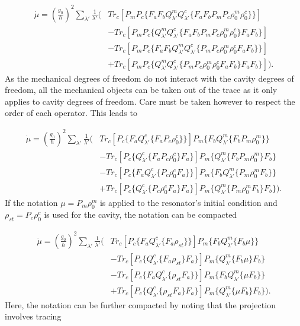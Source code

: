 \documentclass[12pt]{article}
\begin{document}
\begin{align*}
    \dot{\mu} = (\frac{g_0 }{\hbar})^2 \sum_{\lambda'}\frac{1}{\lambda'}\Bigg(& Tr_c[P_mP_c\{F_a F_bQ^m_{\lambda'}Q^c_{\lambda'}\{F_a F_bP_mP_c\rho_0^m\rho_0^c\}\}]\\
    &-Tr_c[P_mP_c\{Q^m_{\lambda'}Q^c_{\lambda'}\{F_a F_bP_mP_c\rho_0^m\rho_0^c\}F_a F_b\}]\\
    &-Tr_c[P_mP_c\{F_a F_bQ^m_{\lambda'}Q^c_{\lambda'}\{P_mP_c\rho_0^m\rho_0^c F_a F_b\} \}]\\ &+Tr_c[P_mP_c\{Q^m_{\lambda'}Q^c_{\lambda'}\{P_mP_c\rho_0^m\rho_0^c F_a F_b\}F_a F_b\}] \Bigg).
\end{align*} As the mechanical degrees of freedom do not interact with the cavity degrees of freedom, all the mechanical objects can be taken out of the trace as it only applies to cavity degrees of freedom. Care must be taken however to respect the order of each operator. This leads to

\begin{align*}
    \dot{\mu} = (\frac{g_0 }{\hbar})^2 \sum_{\lambda'}\frac{1}{\lambda'}\Bigg(& Tr_c[P_c\{F_a Q^c_{\lambda'}\{F_a P_c\rho_0^c\}\}]P_m\{F_bQ^m_{\lambda'}\{F_bP_m\rho_0^m\}\}\\
    &-Tr_c[P_c\{Q^c_{\lambda'}\{F_a P_c\rho_0^c\}F_a \}]P_m\{Q^m_{\lambda'}\{F_bP_m\rho_0^m\}F_b\}\\
    &-Tr_c[P_c\{F_a Q^c_{\lambda'}\{P_c\rho_0^cF_a \} \}]P_m\{F_bQ^m_{\lambda'}\{ P_m\rho_0^mF_b\}\}\\ &+Tr_c[P_c\{Q^c_{\lambda'}\{P_c\rho_0^cF_a  \}F_a \}]P_m\{Q^m_{\lambda'}\{P_m\rho_0^mF_b\}F_b\} \Bigg).
\end{align*} If the notation $\mu=P_m\rho_0^m$ is applied to the resonator's initial condition and $\rho_{st}=P_c\rho_0^c$ is used for the cavity, the notation can be compacted

\begin{align*}
    \dot{\mu} = (\frac{g_0 }{\hbar})^2 \sum_{\lambda'}\frac{1}{\lambda'}\Bigg(& Tr_c[P_c\{F_a Q^c_{\lambda'}\{F_a \rho_{st}\}\}]P_m\{F_b Q^m_{\lambda'}\{F_b\mu\}\}\\
    &-Tr_c[P_c\{Q^c_{\lambda'}\{F_a \rho_{st}\}F_a \}]P_m\{Q^m_{\lambda'}\{F_b\mu\}F_b\}\\
    &-Tr_c[P_c\{F_a Q^c_{\lambda'}\{\rho_{st}F_a \} \}]P_m\{F_b Q^m_{\lambda'}\{ \mu F_b\}\}\\ &+Tr_c[P_c\{Q^c_{\lambda'}\{\rho_{st} F_a \}F_a \}]P_m\{Q^m_{\lambda'}\{\mu F_b\}F_b\} \Bigg).
\end{align*} Here, the notation can be further compacted by noting that the projection involves tracing
\end{document}
